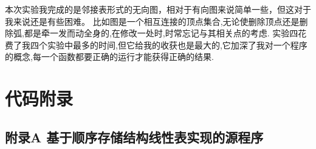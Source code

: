 \documentclass[supercite]{HustGraduPaper}
\theoremstyle{definition}
\begin{document}
本次实验我完成的是邻接表形式的无向图，相对于有向图来说简单一些，但这对于我来说还是有些困难。
比如图是一个相互连接的顶点集合,无论使删除顶点还是删除弧,都是牵一发而动全身的,在修改一处时,时常忘记与其相关点的考虑.
实验四花费了我四个实验中最多的时间,但它给我的收获也是最大的,它加深了我对一个程序的概念,每一个函数都要正确的运行才能获得正确的结果.

\newpage
\nocite{*}


\setcounter{secnumdepth}{0}
\appendix
\section{代码附录}
\subsection{附录A 基于顺序存储结构线性表实现的源程序}\label{sec:附录a-基于顺序存储结构线性表实现的源程序}
\end{document}
